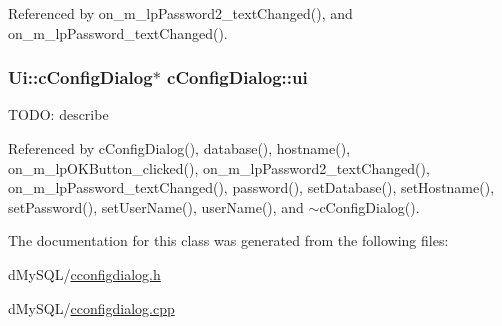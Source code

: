 Referenced by on\+\_\+m\+\_\+lp\+Password2\+\_\+text\+Changed(), and on\+\_\+m\+\_\+lp\+Password\+\_\+text\+Changed().

\subsubsection[{\texorpdfstring{ui}{ui}}]{\setlength{\rightskip}{0pt plus 5cm}Ui\+::c\+Config\+Dialog$\ast$ c\+Config\+Dialog\+::ui\hspace{0.3cm}{\ttfamily [private]}}\hypertarget{classc_config_dialog_a57a160e7fe62e54d86b7f3592aaee2f6}{}\label{classc_config_dialog_a57a160e7fe62e54d86b7f3592aaee2f6}
T\+O\+DO\+: describe 

Referenced by c\+Config\+Dialog(), database(), hostname(), on\+\_\+m\+\_\+lp\+O\+K\+Button\+\_\+clicked(), on\+\_\+m\+\_\+lp\+Password2\+\_\+text\+Changed(), on\+\_\+m\+\_\+lp\+Password\+\_\+text\+Changed(), password(), set\+Database(), set\+Hostname(), set\+Password(), set\+User\+Name(), user\+Name(), and $\sim$c\+Config\+Dialog().



The documentation for this class was generated from the following files\+:\begin{DoxyCompactItemize}
\item 
d\+My\+S\+Q\+L/\hyperlink{cconfigdialog_8h}{cconfigdialog.\+h}\item 
d\+My\+S\+Q\+L/\hyperlink{cconfigdialog_8cpp}{cconfigdialog.\+cpp}\end{DoxyCompactItemize}
